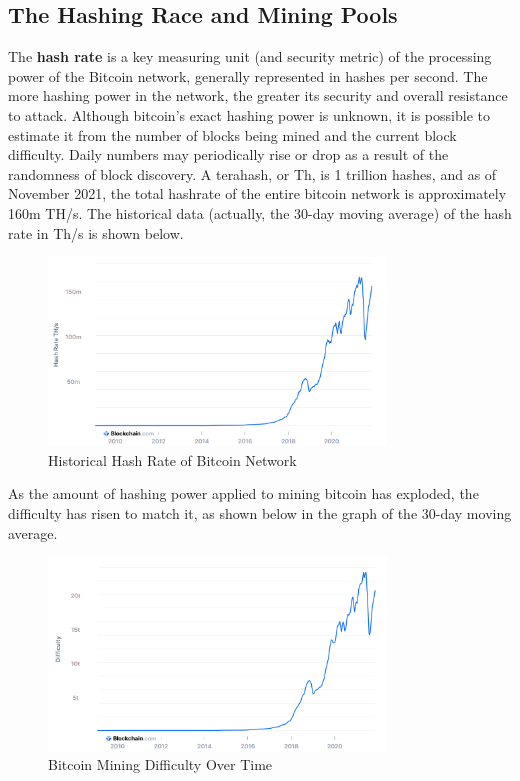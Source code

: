 \documentclass{article}
\begin{document}
  \subsection{The Hashing Race and Mining Pools}

    The \textbf{hash rate} is a key measuring unit (and security metric) of the processing power of the Bitcoin network, generally represented in hashes per second. The more hashing power in the network, the greater its security and overall resistance to attack. Although bitcoin's exact hashing power is unknown, it is possible to estimate it from the number of blocks being mined and the current block difficulty. Daily numbers may periodically rise or drop as a result of the randomness of block discovery. A terahash, or Th, is 1 trillion hashes, and as of November 2021, the total hashrate of the entire bitcoin network is approximately 160m TH/s. The historical data (actually, the 30-day moving average) of the hash rate in Th/s is shown below.

    \begin{figure}[H]
    \centering
    \includegraphics[width=0.8\textwidth]{img/Blockchain Explorer - Search the Blockchain.png}
    \caption{Historical Hash Rate of Bitcoin Network}
    \end{figure}

    As the amount of hashing power applied to mining bitcoin has exploded, the difficulty has risen to match it, as shown below in the graph of the 30-day moving average.

    \begin{figure}[H]
    \centering
    \includegraphics[width=0.8\textwidth]{img/Difficulty_Chart.png}
    \caption{Bitcoin Mining Difficulty Over Time}
    \end{figure}
\end{document}
